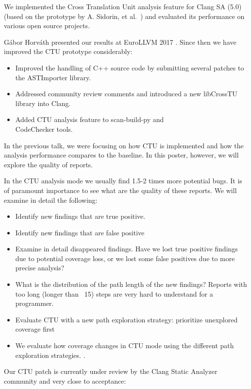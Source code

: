 \documentclass[sigconf]{acmart}
\begin{document}
We implemented the Cross Translation Unit analysis feature for Clang SA (5.0) 
(based on the prototype by A. Sidorin, et al.~\cite{artemctu}) and evaluated 
its performance on various open source projects. 

G\'abor Horv\'ath presented our results at EuroLLVM 2017 \cite{eurollvm17}.
Since then we have improved the CTU prototype considerably: 
\begin{itemize}
\item Improved the handling of C++ source code by submitting several patches  
to the ASTImporter library.
\item Addressed community review comments and introduced a new libCrossTU library into Clang.
\item Added CTU analysis feature to scan-build-py and\\ CodeChecker tools.
\end{itemize}

In the previous talk, we were focusing on how CTU is implemented and how the 
analysis performance compares to the baseline. In this poster, however, we will 
explore the quality of reports.

In the CTU analysis mode we usually find 1.5-2 times more potential bugs.
It is of paramount importance to see what are the quality of these reports.
We will examine in detail the following:
\begin{itemize}
\item Identify new findings that are true positive.
\item Identify new findings that are false positive
\item Examine in detail disappeared findings. Have we lost true positive findings
due to potential coverage loss, or we lost some false positives due 
to more precise analysis?
\item What is the distribution of the path length of the new findings? Reports
with too long (longer than ~15) steps are very hard to understand for a programmer.
\item Evaluate CTU with a new path exploration strategy: prioritize unexplored coverage first
\item We evaluate how coverage changes in CTU mode using the different path exploration strategies.
\cite{karpenkov}.
\end{itemize}

Our CTU patch is currently under review by the Clang Static Analyzer community
and very close to acceptance: \cite{patch}
\end{document}
